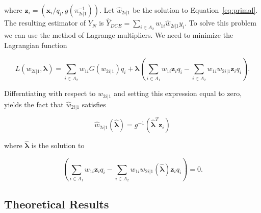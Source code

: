 \documentclass[12pt]{article}
\renewcommand{\bf}[1]{\mathbf{#1}}
\begin{document}
where  $\bf z_i = (\bf x_i / q_i, g(\pi_{2i|1}^{-1}))$. 
Let $\hat w_{2i|1}$ be the solution to Equation~\eqref{eq:primal}. The resulting 
estimator of $Y_N$ is $\hat Y_{DCE} = \sum_{i \in A_2} w_{1i} \hat w_{2i|1} y_i$.
To solve this problem we can use the method of Lagrange multipliers. We need to
minimize the Lagrangian function

\begin{equation}\label{eq:legragedc1}
  L(w_{2i|1}, \bm \lambda) = \sum_{i \in A_2} w_{1i} G(w_{2i|1}) q_i 
  + \bm \lambda \left( \sum_{i \in A_1} w_{1i} \bf z_i q_i -
    \sum_{i \in A_2} w_{1i} w_{2i|1} \bf z_i q_i\right).
\end{equation}

Differntiating with respect to $w_{2i|1}$ and setting this expression equal to
zero, yields the fact that $\hat w_{2i|1}$ satisfies 

$$ \hat w_{2i|1}(\hat{\bm \lambda}) = g^{-1}(\hat{\bm \lambda}^T \bf z_i) $$

where $\hat{\bm \lambda}$ is the solution to

\begin{equation}\label{eq:lamdc1}
  \left( \sum_{i \in A_1} w_{1i} \bf z_i q_i -
  \sum_{i \in A_2} w_{1i} w_{2i|1}(\hat{\bm \lambda}) \bf z_i q_i\right) = 0.
\end{equation}

\subsection{Theoretical Results}
\end{document}
